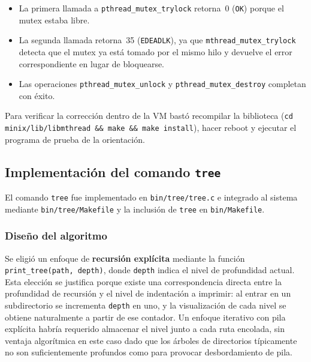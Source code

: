\documentclass[11pt,a4paper]{article}
\begin{document}
\begin{itemize}[leftmargin=*]
  \item La primera llamada a \texttt{pthread\_mutex\_trylock} retorna~0 (\texttt{OK}) porque el mutex estaba libre.
  \item La segunda llamada retorna~35 (\texttt{EDEADLK}), ya que \texttt{mthread\_mutex\_trylock} detecta que el mutex ya est\'a tomado por el mismo hilo y devuelve el error correspondiente en lugar de bloquearse.
  \item Las operaciones \texttt{pthread\_mutex\_unlock} y \texttt{pthread\_mutex\_destroy} completan con \'exito.
\end{itemize}

Para verificar la correcci\'on dentro de la VM bast\'o recompilar la biblioteca (\texttt{cd minix/lib/libmthread \&\& make \&\& make install}), hacer reboot y ejecutar el programa de prueba de la orientaci\'on.

\subsection{Implementaci\'on del comando \texttt{tree}}

El comando \texttt{tree} fue implementado en \texttt{bin/tree/tree.c} e integrado al sistema mediante \texttt{bin/tree/Makefile} y la inclusi\'on de \texttt{tree} en \texttt{bin/Makefile}.

\subsubsection*{Dise\~no del algoritmo}

Se eligi\'o un enfoque de \textbf{recursi\'on expl\'icita} mediante la funci\'on \texttt{print\_tree(path, depth)}, donde \texttt{depth} indica el nivel de profundidad actual. Esta elecci\'on se justifica porque existe una correspondencia directa entre la profundidad de recursi\'on y el nivel de indentaci\'on a imprimir: al entrar en un subdirectorio se incrementa \texttt{depth} en uno, y la visualizaci\'on de cada nivel se obtiene naturalmente a partir de ese contador. Un enfoque iterativo con pila expl\'icita habr\'ia requerido almacenar el nivel junto a cada ruta encolada, sin ventaja algor\'itmica en este caso dado que los \'arboles de directorios t\'ipicamente no son suficientemente profundos como para provocar desbordamiento de pila.
\end{document}
